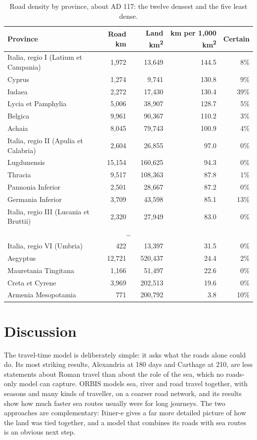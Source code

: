 \documentclass[11pt,a4paper]{article}
\begin{document}
\begin{table}[tbp]\centering\small\caption{Road density by province, about AD 117: the twelve densest and the five least dense.}\label{tab:prov}\begin{tabular}{lrrrr}\toprule Province & Road km & Land km\textsuperscript{2} & km per 1,000 km\textsuperscript{2} & Certain\\\midrule
Italia, regio I (Latium et Campania) & 1,972 & 13,649 & 144.5 & 8\%\\
Cyprus & 1,274 & 9,741 & 130.8 & 9\%\\
Iudaea & 2,272 & 17,430 & 130.4 & 39\%\\
Lycia et Pamphylia & 5,006 & 38,907 & 128.7 & 5\%\\
Belgica & 9,961 & 90,367 & 110.2 & 3\%\\
Achaia & 8,045 & 79,743 & 100.9 & 4\%\\
Italia, regio II (Apulia et Calabria) & 2,604 & 26,855 & 97.0 & 0\%\\
Lugdunensis & 15,154 & 160,625 & 94.3 & 0\%\\
Thracia & 9,517 & 108,363 & 87.8 & 1\%\\
Pannonia Inferior & 2,501 & 28,667 & 87.2 & 0\%\\
Germania Inferior & 3,709 & 43,598 & 85.1 & 13\%\\
Italia, regio III (Lucania et Bruttii) & 2,320 & 27,949 & 83.0 & 0\%\\
\multicolumn{5}{c}{\dots}\\
Italia, regio VI (Umbria) & 422 & 13,397 & 31.5 & 0\%\\
Aegyptus & 12,721 & 520,437 & 24.4 & 2\%\\
Mauretania Tingitana & 1,166 & 51,497 & 22.6 & 0\%\\
Creta et Cyrene & 3,969 & 202,513 & 19.6 & 0\%\\
Armenia Mesopotamia & 771 & 200,792 & 3.8 & 10\%\\
\bottomrule\end{tabular}\end{table}

\section{Discussion}
The travel-time model is deliberately simple: it asks what the roads alone could do. Its most striking results, Alexandria at 180 days and Carthage at 210, are less statements about Roman travel than about the role of the sea, which no roads-only model can capture. ORBIS \citep{orbis,scheidel2014} models sea, river and road travel together, with seasons and many kinds of traveller, on a coarser road network, and its results show how much faster sea routes usually were for long journeys. The two approaches are complementary: Itiner-e gives a far more detailed picture of how the land was tied together, and a model that combines its roads with sea routes is an obvious next step.
\end{document}
